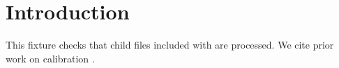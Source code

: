 \section{Introduction}
This fixture checks that child files included with  are processed.
We cite prior work on calibration \cite{guo2017calibration}.
